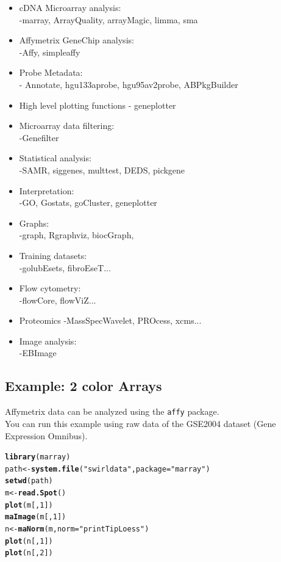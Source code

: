\documentclass[10pt]{article}\usepackage[]{graphicx}\usepackage[]{color}
\makeatletter
\newcommand{\hlnum}[1]{\textcolor[rgb]{0.686,0.059,0.569}{#1}}%
\newcommand{\hlstr}[1]{\textcolor[rgb]{0.192,0.494,0.8}{#1}}%
\newcommand{\hlstd}[1]{\textcolor[rgb]{0.345,0.345,0.345}{#1}}%
\newcommand{\hlkwb}[1]{\textcolor[rgb]{0.69,0.353,0.396}{#1}}%
\newcommand{\hlkwc}[1]{\textcolor[rgb]{0.333,0.667,0.333}{#1}}%
\newcommand{\hlkwd}[1]{\textcolor[rgb]{0.737,0.353,0.396}{\textbf{#1}}}%
\newenvironment{kframe}{%
 \def\at@end@of@kframe{}%
 \ifinner\ifhmode%
  \def\at@end@of@kframe{\end{minipage}}%
  \begin{minipage}{\columnwidth}%
 \fi\fi%
 \def\FrameCommand##1{\hskip\@totalleftmargin \hskip-\fboxsep
 \colorbox{shadecolor}{##1}\hskip-\fboxsep
     \hskip-\linewidth \hskip-\@totalleftmargin \hskip\columnwidth}%
 \MakeFramed {\advance\hsize-\width
   \@totalleftmargin\z@ \linewidth\hsize
   \@setminipage}}%
 {\par\unskip\endMakeFramed%
 \at@end@of@kframe}
\newenvironment{knitrout}{}{} %
\newcommand{\Rfunction}[1]{{\texttt{#1}}}
\makeatother
\begin{document}
\begin{itemize}
\item cDNA Microarray analysis:\\
  -marray, ArrayQuality, arrayMagic, limma, sma
\item  Affymetrix GeneChip analysis:\\
  -Affy, simpleaffy
\item  Probe Metadata:\\
- Annotate, hgu133aprobe,  hgu95av2probe, ABPkgBuilder
\item High level plotting functions
- geneplotter
\item  Microarray data filtering:\\
  -Genefilter
\item  Statistical analysis:\\
  -SAMR, siggenes, multtest, DEDS, pickgene
\item Interpretation:\\
  -GO, Gostats, goCluster, geneplotter
\item Graphs:\\
  -graph, Rgraphviz, biocGraph,
\item Training datasets:\\
  -golubEsets, fibroEseT...
\item Flow cytometry:\\
  -flowCore, flowViZ...
\item Proteomics
  -MassSpecWavelet, PROcess, xcms...
\item Image analysis:\\
  -EBImage
\end{itemize}


\subsection{Example: 2 color Arrays}

Affymetrix data can be analyzed using the \Rfunction{affy} package.\\
You can run this example using raw data of the GSE2004 dataset (Gene Expression Omnibus).\\

\begin{knitrout}
\color{fgcolor}\begin{kframe}
\begin{alltt}
\hlkwd{library}\hlstd{(marray)}
\hlstd{path} \hlkwb{<-} \hlkwd{system.file}\hlstd{(}\hlstr{"swirldata"}\hlstd{,} \hlkwc{package} \hlstd{=} \hlstr{"marray"}\hlstd{)}
\hlkwd{setwd}\hlstd{(path)}
\hlstd{m} \hlkwb{<-} \hlkwd{read.Spot}\hlstd{()}
\hlkwd{plot}\hlstd{(m[,}\hlnum{1}\hlstd{])}
\hlkwd{maImage}\hlstd{(m[,}\hlnum{1}\hlstd{])}
\hlstd{n} \hlkwb{<-} \hlkwd{maNorm}\hlstd{(m,}\hlkwc{norm}\hlstd{=}\hlstr{"printTipLoess"}\hlstd{)}
\hlkwd{plot}\hlstd{(n[,}\hlnum{1}\hlstd{])}
\hlkwd{plot}\hlstd{(n[,}\hlnum{2}\hlstd{])}
\end{alltt}
\end{kframe}
\end{knitrout}
\end{document}
